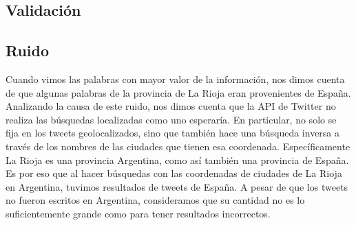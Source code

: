 \subsection{Validación}

\subsection{Ruido} %
\label{ssub:ruido}


Cuando vimos las palabras con mayor valor de la información, nos dimos cuenta de que algunas palabras de la provincia de La Rioja eran provenientes de España. Analizando la causa de este ruido, nos dimos cuenta que la API de Twitter no realiza las búsquedas localizadas como uno esperaría. En particular, no solo se fija en los tweets geolocalizados, sino que también hace una búsqueda inversa a través de los nombres de las ciudades que tienen esa coordenada. Específicamente La Rioja es una provincia Argentina, como así también una provincia de España. Es por eso que al hacer búsquedas con las coordenadas de ciudades de La Rioja en Argentina, tuvimos resultados de tweets de España. A pesar de que los tweets no fueron escritos en Argentina, consideramos que su cantidad no es lo suficientemente grande como para tener resultados incorrectos.



